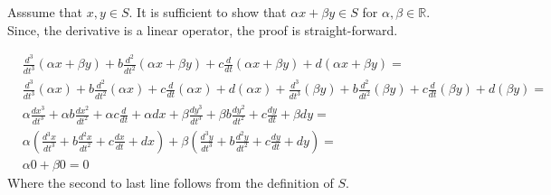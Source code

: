 \documentclass{homework}
\begin{document}
\begin{solution}
  Asssume that $x,y \in S$. It is sufficient to show that $\alpha x + \beta y \in S$ for $\alpha, \beta \in \mathds{R}$.
  Since, the derivative is a linear operator, the proof is straight-forward.

  $
  \begin{aligned}
    &\frac{d^3}{dt^3}(\alpha x + \beta y) + b\frac{d^2}{dt^2}(\alpha x + \beta y) + c\frac{d}{dt}(\alpha x + \beta y) + d(\alpha x + \beta y) = \\
    &\frac{d^3}{dt^3}(\alpha x) + b\frac{d^2}{dt^2}(\alpha x) + c\frac{d}{dt}(\alpha x) + d(\alpha x) + \frac{d^3}{dt^3}(\beta y) + b\frac{d^2}{dt^2}(\beta y) + c\frac{d}{dt}(\beta y) + d(\beta y) = \\
    &\alpha\frac{dx^3}{dt^3} + \alpha b\frac{dx^2}{dt^2} + \alpha c\frac{d}{dt} + \alpha dx + \beta \frac{dy^3}{dt^3} + \beta b\frac{dy^2}{dt^2} + c\frac{dy}{dt} + \beta d y = \\
    &\alpha\left(\frac{d^3x}{dt^3} + b\frac{d^2x}{dt^2} + c\frac{dx}{dt} + dx\right) + \beta\left(\frac{d^3y}{dt^3} + b\frac{d^2y}{dt^2} + c\frac{dy}{dt} + dy\right) = \\
    &\alpha 0 + \beta 0 = 0
  \end{aligned}
  $
  Where the second to last line follows from the definition of $S$.

\end{solution}
\end{document}
